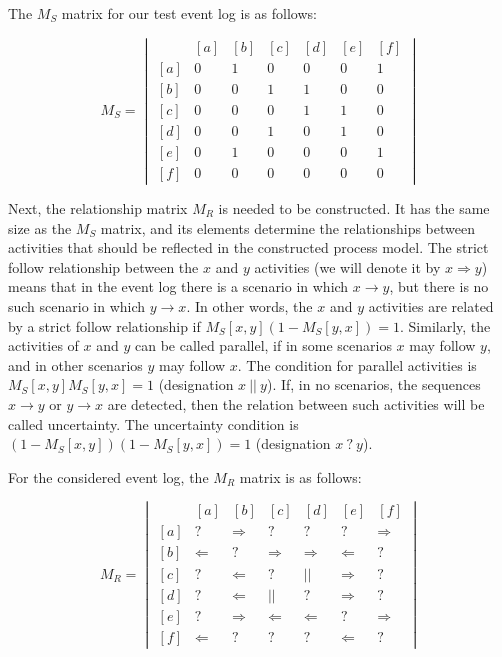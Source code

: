 \documentclass[
11pt,%
tightenlines,%
twoside,%
onecolumn,%
nofloats,%
nobibnotes,%
nofootinbib,%
superscriptaddress,%
noshowpacs,%
centertags]%
{revtex4}
\begin{document}
The $M_S$ matrix for our test event log is as follows:

\begin{equation}
M_S = \begin{vmatrix}
\ & [a] & [b] & [c] & [d] & [e] & [f] \\
[a] & 0 & 1 & 0 & 0 & 0 & 1 \\ 
[b] & 0 & 0 & 1 & 1 & 0 & 0 \\
[c] & 0 & 0 & 0 & 1 & 1 & 0 \\
[d] & 0 & 0 & 1 & 0 & 1 & 0 \\
[e] & 0 & 1 & 0 & 0 & 0 & 1 \\
[f] & 0 & 0 & 0 & 0 & 0 & 0
\end{vmatrix}
\end{equation}

Next, the relationship matrix $M_R$ is needed to be constructed.
It has the same size as the $M_S$ matrix, and its elements determine the relationships between activities that should be reflected in the constructed process model.
The strict follow relationship between the $x$ and $y$ activities (we will denote it by $x \Rightarrow y$) means that in the event log there is a scenario in which $x \rightarrow y$, but there is no such scenario in which $y \rightarrow x$.
In other words, the $x$ and $y$ activities are related by a strict follow relationship if $M_S[x, y](1 - M_S[y, x]) = 1$.
Similarly, the activities of $x$ and $y$ can be called parallel, if in some scenarios $x$ may follow $y$, and in other scenarios $y$ may follow $x$.
The condition for parallel activities is $M_S[x, y]M_S[y, x] = 1$ (designation $x \ || \ y$).
If, in no scenarios, the sequences $x \rightarrow y$ or $y \rightarrow x$ are detected, then the relation between such activities will be called uncertainty.
The uncertainty condition is $(1 - M_S[x, y])(1 - M_S[y, x]) = 1$ (designation $x \ ? \ y$).

For the considered event log, the $M_R$ matrix is as follows:

\begin{equation}\label{eqn:r}
M_R = \begin{vmatrix}
\ & [a] & [b] & [c] & [d] & [e] & [f] \\
[a] & ? & \Rightarrow & ? & ? & ? & \Rightarrow \\ 
[b] & \Leftarrow & ? & \Rightarrow & \Rightarrow & \Leftarrow & ? \\
[c] & ? & \Leftarrow & ? & || & \Rightarrow & ? \\
[d] & ? & \Leftarrow & || & ? & \Rightarrow & ? \\
[e] & ? & \Rightarrow & \Leftarrow & \Leftarrow & ? & \Rightarrow \\
[f] & \Leftarrow & ? & ? & ? & \Leftarrow & ?
\end{vmatrix}
\end{equation}
\end{document}

